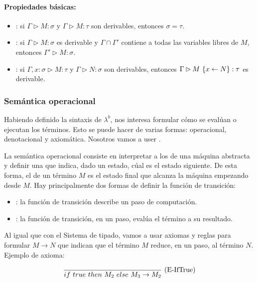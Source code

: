 \paragraph{Propiedades básicas:}

\begin{itemize}
  \item {}: si $\Gamma \rhd M : \sigma$ y $\Gamma \rhd M : \tau$ son derivables, entonces $\sigma = \tau$.
  \item {}: si $\Gamma \rhd M : \sigma$ es derivable y $\Gamma \cap \Gamma'$ contiene a todas las variables libres de $M$, entonces $\Gamma' \rhd M : \sigma$.
  \item {}: si $\Gamma,x:\sigma \rhd M : \tau$ y $\Gamma \rhd N : \sigma$ son derivables, entonces $\Gamma \rhd M\ \{x\leftarrow N\} : \tau$ es derivable.
\end{itemize}

\subsubsection{Semántica operacional}

Habiendo definido la sintaxis de $\lambda^b$, nos interesa formular cómo se evalúan o ejecutan los términos. Esto se puede hacer de varias formas: operacional, denotacional y axiomática. Nosotros vamos a user .

La semántica operacional consiste en interpretar a los  de una máquina abstracta y definir una  que indica, dado un estado, cúal es el estado siguiente. De esta forma, el  de un término $M$ es el estado final que alcanza la máquina empezando desde $M$. Hay principalmente dos formas de definir la función de transición:

\begin{itemize}
  \item {}: la función de transición describe un paso de computación.
  \item {}: la función de transición, en un paso, evalúa el término a su resultado.
\end{itemize}

Al igual que con el Sistema de tipado, vamos a usar axiomas y reglas para formular  $M\to N$ que indican que el término $M$ reduce, en un paso, al término $N$. Ejemplo de axioma:

\[\frac{}{if\ true\ then\ M_2\ else\ M_3 \to M_2}\ \text{(E-IfTrue)}\]

